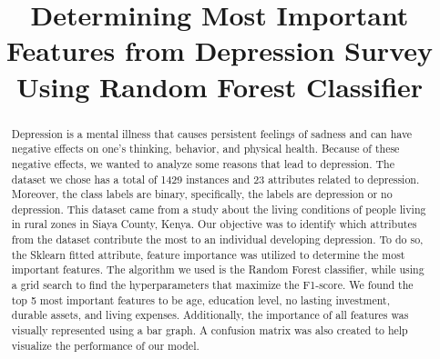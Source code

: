 \documentclass[conference]{IEEEtran}
\begin{document}
\title{Determining Most Important Features from Depression Survey Using Random Forest Classifier\\}

\author{
\and
{}

\and
{}
\and
{}

}

\maketitle

\begin{abstract}
Depression is a mental illness that causes persistent feelings of sadness and can have negative effects on one's thinking, behavior, and physical health. Because of these negative effects, we wanted to analyze some reasons that lead to depression. The dataset we chose has a total of 1429 instances and 23 attributes related to depression. Moreover, the class labels are binary, specifically, the labels are depression or no depression. This dataset came from a study about the living conditions of people living in rural zones in Siaya County, Kenya. Our objective was to identify which attributes from the dataset contribute the most to an individual developing depression. To do so, the Sklearn fitted attribute, feature importance was utilized to determine the most important features. The algorithm we used is the Random Forest classifier, while using a grid search to find the hyperparameters that maximize the F1-score. We found the top 5 most important features to be age, education level, no lasting investment, durable assets, and living expenses. Additionally, the importance of all features was visually represented using a bar graph. A confusion matrix was also created to help visualize the performance of our model.

\end{abstract}
\end{document}
